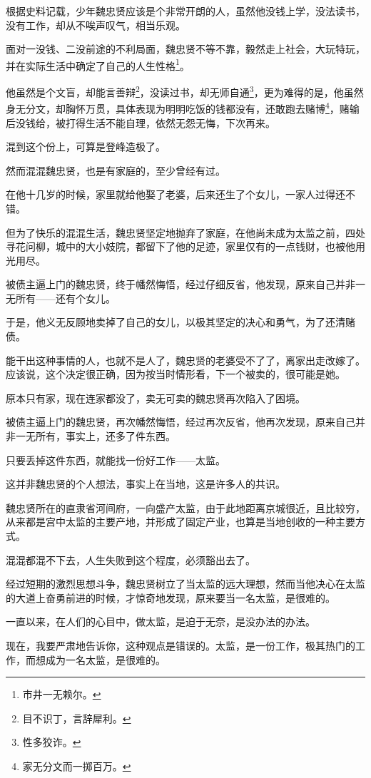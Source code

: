 \begin{multicols}{\theparacolNo}
		根据史料记载，少年魏忠贤应该是个非常开朗的人，虽然他没钱上学，没法读书，没有工作，却从不唉声叹气，相当乐观。

		面对一没钱、二没前途的不利局面，魏忠贤不等不靠，毅然走上社会，大玩特玩，并在实际生活中确定了自己的人生性格\footnote{市井一无赖尔。}。

		他虽然是个文盲，却能言善辩\footnote{目不识丁，言辞犀利。}，没读过书，却无师自通\footnote{性多狡诈。}，更为难得的是，他虽然身无分文，却胸怀万贯，具体表现为明明吃饭的钱都没有，还敢跑去赌博\footnote{家无分文而一掷百万。}，赌输后没钱给，被打得生活不能自理，依然无怨无悔，下次再来。

		混到这个份上，可算是登峰造极了。

		然而混混魏忠贤，也是有家庭的，至少曾经有过。

		在他十几岁的时候，家里就给他娶了老婆，后来还生了个女儿，一家人过得还不错。

		但为了快乐的混混生活，魏忠贤坚定地抛弃了家庭，在他尚未成为太监之前，四处寻花问柳，城中的大小妓院，都留下了他的足迹，家里仅有的一点钱财，也被他用光用尽。

		被债主逼上门的魏忠贤，终于幡然悔悟，经过仔细反省，他发现，原来自己并非一无所有——还有个女儿。

		于是，他义无反顾地卖掉了自己的女儿，以极其坚定的决心和勇气，为了还清赌债。

		能干出这种事情的人，也就不是人了，魏忠贤的老婆受不了了，离家出走改嫁了。应该说，这个决定很正确，因为按当时情形看，下一个被卖的，很可能是她。

		原本只有家，现在连家都没了，卖无可卖的魏忠贤再次陷入了困境。

		被债主逼上门的魏忠贤，再次幡然悔悟，经过再次反省，他再次发现，原来自己并非一无所有，事实上，还多了件东西。

		只要丢掉这件东西，就能找一份好工作——太监。

		这并非魏忠贤的个人想法，事实上在当地，这是许多人的共识。

		魏忠贤所在的直隶省河间府，一向盛产太监，由于此地距离京城很近，且比较穷，从来都是宫中太监的主要产地，并形成了固定产业，也算是当地创收的一种主要方式。

		混混都混不下去，人生失败到这个程度，必须豁出去了。

		经过短期的激烈思想斗争，魏忠贤树立了当太监的远大理想，然而当他决心在太监的大道上奋勇前进的时候，才惊奇地发现，原来要当一名太监，是很难的。

		一直以来，在人们的心目中，做太监，是迫于无奈，是没办法的办法。

		现在，我要严肃地告诉你，这种观点是错误的。太监，是一份工作，极其热门的工作，而想成为一名太监，是很难的。


\end{multicols}

